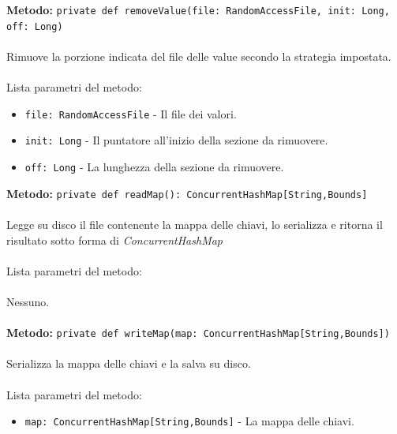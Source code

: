 \documentclass[a4paper]{article}
\begin{document}
		\textbf{Metodo:} \texttt{private def removeValue(file: RandomAccessFile, init: Long, off: Long)}
		\\ \\
		Rimuove la porzione indicata del file delle value secondo la strategia impostata.
		\\ \\
		Lista parametri del metodo:
		\begin{itemize}
			\item \texttt{file: RandomAccessFile} - Il file dei valori.
			\item \texttt{init: Long} - Il puntatore all'inizio della sezione da rimuovere.
			\item \texttt{off: Long} - La lunghezza della sezione da rimuovere.
		\end{itemize}
		\textbf{Metodo:} \texttt{private def readMap(): ConcurrentHashMap[String,Bounds]}
		\\ \\
		Legge su disco il file contenente la mappa delle chiavi, lo serializza e ritorna il risultato sotto forma di \emph{ConcurrentHashMap}
		\\ \\
		Lista parametri del metodo:
		\\ \\
		Nessuno.
		\\ \\
		\textbf{Metodo:} \texttt{private def writeMap(map: ConcurrentHashMap[String,Bounds])}
		\\ \\
		Serializza la mappa delle chiavi e la salva su disco.
		\\ \\
		Lista parametri del metodo:
		\begin{itemize}
			\item \texttt{map: ConcurrentHashMap[String,Bounds]} - La mappa delle chiavi.
		\end{itemize}
		
\end{document}
